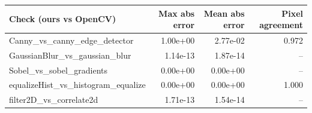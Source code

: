 \begin{tabular}{lrrr}
\toprule
Check (ours vs OpenCV) & Max abs error & Mean abs error & Pixel agreement \\
\midrule
Canny\_vs\_canny\_edge\_detector & 1.00e+00 & 2.77e-02 & 0.972 \\
GaussianBlur\_vs\_gaussian\_blur & 1.14e-13 & 1.87e-14 & -- \\
Sobel\_vs\_sobel\_gradients & 0.00e+00 & 0.00e+00 & -- \\
equalizeHist\_vs\_histogram\_equalize & 0.00e+00 & 0.00e+00 & 1.000 \\
filter2D\_vs\_correlate2d & 1.71e-13 & 1.54e-14 & -- \\
\bottomrule
\end{tabular}
